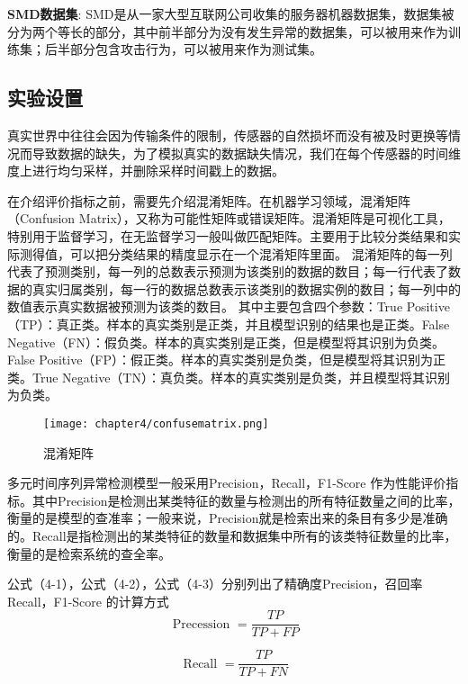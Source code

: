 \textbf{SMD数据集}: SMD是从一家大型互联网公司收集的服务器机器数据集，数据集被分为两个等长的部分，其中前半部分为没有发生异常的数据集，可以被用来作为训练集；后半部分包含攻击行为，可以被用来作为测试集。

\subsection{实验设置}

真实世界中往往会因为传输条件的限制，传感器的自然损坏而没有被及时更换等情况而导致数据的缺失，为了模拟真实的数据缺失情况，我们在每个传感器的时间维度上进行均匀采样，并删除采样时间戳上的数据。

在介绍评价指标之前，需要先介绍混淆矩阵。在机器学习领域，混淆矩阵（Confusion Matrix），又称为可能性矩阵或错误矩阵。混淆矩阵是可视化工具，特别用于监督学习，在无监督学习一般叫做匹配矩阵。主要用于比较分类结果和实际测得值，可以把分类结果的精度显示在一个混淆矩阵里面。
混淆矩阵的每一列代表了预测类别，每一列的总数表示预测为该类别的数据的数目；每一行代表了数据的真实归属类别，每一行的数据总数表示该类别的数据实例的数目；每一列中的数值表示真实数据被预测为该类的数目。
其中主要包含四个参数：True Positive（TP）：真正类。样本的真实类别是正类，并且模型识别的结果也是正类。False Negative（FN）：假负类。样本的真实类别是正类，但是模型将其识别为负类。 False Positive（FP）：假正类。样本的真实类别是负类，但是模型将其识别为正类。True Negative（TN）：真负类。样本的真实类别是负类，并且模型将其识别为负类。

\begin{figure}[ht]
  \centering
  \texttt{[image: chapter4/confusematrix.png]}
  \caption{混淆矩阵}
  \end{figure}

多元时间序列异常检测模型一般采用Precision，Recall，F1-Score 作为性能评价指标。其中Precision是检测出某类特征的数量与检测出的所有特征数量之间的比率，衡量的是模型的查准率；一般来说，Precision就是检索出来的条目有多少是准确的。Recall是指检测出的某类特征的数量和数据集中所有的该类特征数量的比率，衡量的是检索系统的查全率。

公式（4-1），公式（4-2），公式（4-3）分别列出了精确度Precision，召回率Recall，F1-Score 的计算方式
\begin{equation}
  \text { Precession }=\frac{T P}{T P+F P}
  \end{equation}

\begin{equation}
  \text { Recall }=\frac{T P}{T P+F N}
  \end{equation}

